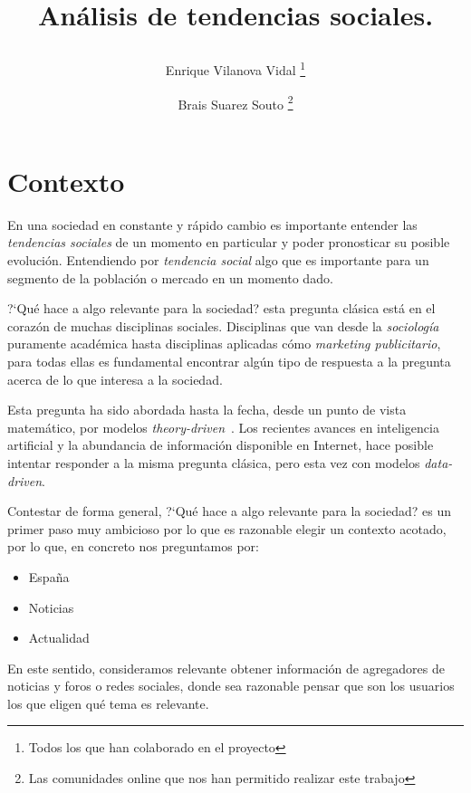 \documentclass[a4paper,12pt]{article}
\title{%

An\'alisis de tendencias sociales.%
	
	\author{%
	Enrique Vilanova Vidal%
		\thanks{Todos los que han colaborado en el proyecto}
	\and Brais Suarez Souto
		\thanks{Las comunidades online que nos han permitido realizar este trabajo}
	}

}
\begin{document}
\maketitle
\thispagestyle{empty}
\clearpage
{} 
\newpage



\section[item_contexto]{Contexto}

En una sociedad en constante y  r\'apido cambio es importante entender las {\itshape tendencias sociales} de un momento en particular y poder pronosticar su posible evoluci\'on.
Entendiendo por  {\itshape tendencia social} algo que es importante para un segmento de la poblaci\'on o mercado en un momento dado.

?`Qu\'e hace a algo relevante para  la sociedad?  esta pregunta cl\'asica  est\'a en el coraz\'on de muchas disciplinas sociales. Disciplinas que van desde la {\itshape sociolog\'ia} puramente acad\'emica hasta disciplinas aplicadas c\'omo {\itshape marketing publicitario}, para todas ellas es fundamental encontrar alg\'un tipo de respuesta a la pregunta acerca de lo que interesa a la sociedad.

Esta pregunta ha sido abordada hasta la fecha, desde un punto de vista matem\'atico, por modelos {\itshape theory-driven}~\cite{td1,td2,td3}. Los recientes avances en inteligencia artificial y la abundancia de informaci\'on disponible en Internet, hace posible intentar responder a la misma pregunta cl\'asica, pero esta vez con modelos {\itshape data-driven}\cite{dd1}.

Contestar de forma general, ?`Qu\'e hace a algo relevante para  la sociedad? es un primer paso muy ambicioso por lo que es razonable elegir un contexto acotado, por lo que, en concreto nos preguntamos por:

\begin{itemize}

\item Espa\~na
\item Noticias
\item Actualidad

\end{itemize}

En este sentido, consideramos relevante obtener informaci\'on de agregadores de noticias y foros o redes sociales, donde sea razonable pensar que son los usuarios los que eligen qu\'e tema es relevante.
\end{document}
